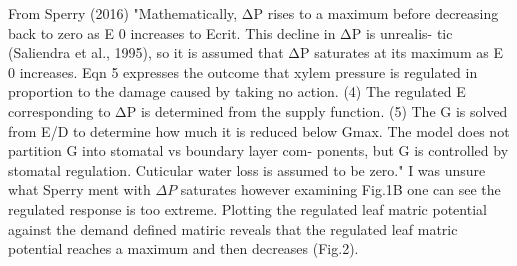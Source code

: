 \documentclass[a4paper]{article}\usepackage[]{graphicx}\usepackage[]{color}
\begin{document}
From Sperry (2016) "Mathematically, ΔP rises to a maximum before decreasing back to zero as E 0 increases to Ecrit. This decline in ΔP is unrealis- tic (Saliendra et al., 1995), so it is assumed that ΔP saturates at its maximum as E 0 increases. Eqn 5 expresses the outcome that xylem pressure is regulated in proportion to the damage caused by taking no action. (4) The regulated E corresponding to ΔP is determined from the supply function. (5) The G is solved from E/D to determine how much it is reduced below Gmax. The model does not partition G into stomatal vs boundary layer com- ponents, but G is controlled by stomatal regulation. Cuticular water loss is assumed to be zero." I was unsure what Sperry ment with $\Delta P$ saturates however examining Fig.1B one can see the regulated response is too extreme. Plotting the regulated leaf matric potential against the demand defined matiric reveals that the regulated leaf matric potential reaches a maximum and then decreases (Fig.2). 



\end{document}

